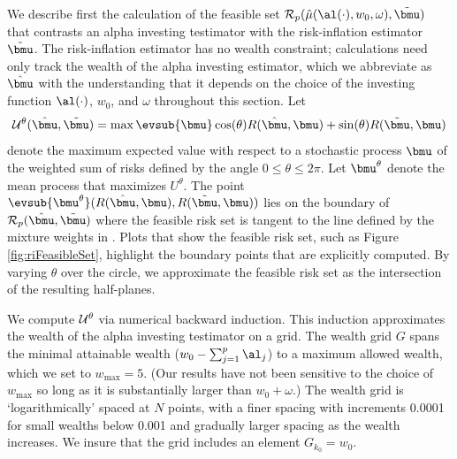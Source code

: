 \documentclass[12pt]{article}
\begin{document}
 We describe first the calculation of the feasible set ${\cal R}_p(\hat\mu(
 \al(\cdot), w_0, \omega), \tilde{\bmu})$ that contrasts an alpha investing
 testimator with the risk-inflation estimator $\tilde{\bmu}$.  The
 risk-inflation estimator has no wealth constraint; calculations need only track
 the wealth of the alpha investing estimator, which we abbreviate as
 $\hat{\bmu}$ with the understanding that it depends on the choice of the
 investing function $\al(\cdot)$, $w_0$, and $\omega$ throughout this section.
  Let
 \begin{equation}
   {\cal U}^\theta(\hat{\bmu},\tilde{\bmu}) = 
       \max \evsub{\bmu} 
       \cos(\theta) R(\hat{\bmu}, \bmu) + \sin(\theta) R(\tilde{\bmu},\bmu) 
 \label{eq:U}
 \end{equation}
 denote the maximum expected value with respect to a stochastic process $\bmu$
 of the weighted sum of risks defined by the angle $ 0 \le \theta \le 2 \pi$.
  Let $\bmu^\theta$ denote the mean process that maximizes $U^\theta$.  The
 point $\evsub{\bmu^\theta}(R(\hat{\bmu}, \bmu), R(\tilde{\bmu}, \bmu))$ lies on
 the boundary of ${\cal R}_p(\hat{\bmu},\tilde{\bmu})$ where the feasible risk
 set is tangent to the line defined by the mixture weights in .  Plots
 that show the feasible risk set, such as Figure \ref{fig:riFeasibleSet},
 highlight the boundary points that are explicitly computed.  By varying
 $\theta$ over the circle, we approximate the feasible risk set as the
 intersection of the resulting half-planes.

 
 We compute ${\cal U}^\theta$ via numerical backward induction.  This induction
 approximates the wealth of the alpha investing testimator on a grid.  The
 wealth grid $G$ spans the minimal attainable wealth ($w_0 - \sum_{j=1}^p
 \al_j$) to a maximum allowed wealth, which we set to $w_{\max} = 5$.  (Our
 results have not been sensitive to the choice of $w_{\max}$ so long as it is
 substantially larger than $w_0 + \omega$.)  The wealth grid is
 `logarithmically' spaced at $N$ points, with a finer spacing with increments
 0.0001 for small wealths below 0.001 and gradually larger spacing as the wealth
 increases.  We insure that the grid includes an element $G_{k_0} = w_0$.
\end{document}
